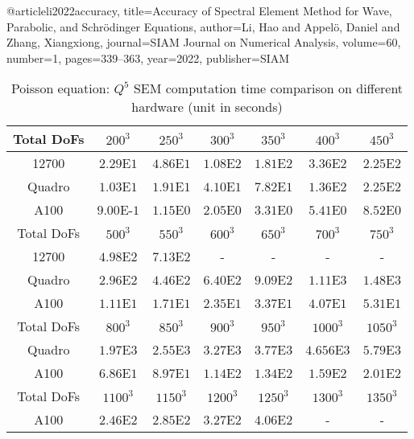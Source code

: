 @article{li2022accuracy,
  title={{Accuracy of Spectral Element Method for Wave, Parabolic, and Schrödinger Equations}},
  author={Li, Hao and Appelö, Daniel and Zhang, Xiangxiong},
  journal={SIAM Journal on Numerical Analysis},
  volume={60},
  number={1},
  pages={339--363},
  year={2022},
  publisher={SIAM}
}
\begin{table}[ht!]
    \centering
    \begin{tabular}{|c|c|c|c|c|c|c|}
    \hline
         Total DoFs & $200^3$ & $250^3$ & $300^3$ & $350^3$ & $400^3$ & $450^3$\\
    \hline
         12700 & $2.29$E$1$ & $4.86$E$1$ & $1.08$E$2$ & $1.81$E$2$ & $3.36$E$2$ &
         $2.25$E$2$\\
    \hline
         Quadro & $1.03$E$1$ & $1.91$E$1$ & $4.10$E$1$ & $7.82$E$1$ & $1.36$E$2$ &
         $2.25$E$2$\\

    \hline
         A100 & $9.00$E-$1$ & $1.15$E$0$ & $2.05$E$0$ & $3.31$E$0$ & $5.41$E$0$ &
         $8.52$E$0$\\
    \hline
    \hline
         Total DoFs & $500^3$ & $550^3$ & $600^3$ & $650^3$ & $700^3$ & $750^3$\\
    \hline
         12700 & $4.98$E$2$ & $7.13$E$2$ & - & - & - & - \\
    \hline
         Quadro & $2.96$E$2$ & $4.46$E$2$ & $6.40$E$2$ & $9.09$E$2$ & $1.11$E$3$ &
         $1.48$E$3$\\
    \hline
         A100 & $1.11$E$1$ & $1.71$E$1$ & $2.35$E$1$ & $3.37$E$1$ & $4.07$E$1$ &
         $5.31$E$1$\\
    \hline
    \hline
         Total DoFs & $800^3$ & $850^3$ & $900^3$ & $950^3$ & $1000^3$ & $1050^3$\\
    \hline
         Quadro & $1.97$E$3$ & $2.55$E$3$ & $3.27$E$3$ & $3.77$E$3$ & $4.656$E$3$ & $5.79$E$3$\\
    \hline
         A100  & $6.86$E$1$ & $8.97$E$1$ & $1.14$E$2$ & $1.34$E$2$ & $1.59$E$2$ &
         $2.01$E$2$\\
    \hline
    \hline
         Total DoFs & $1100^3$ & $1150^3$ & $1200^3$ & $1250^3$ & $1300^3$ & $1350^3$\\
    \hline
         A100 & $2.46$E$2$ & $2.85$E$2$ & $3.27$E$2$ & $4.06$E$2$ & - & -\\
    \hline
    \end{tabular}
    \caption{Poisson equation: $Q^5$ SEM computation time comparison on different hardware (unit in seconds)}
    \label{tab3: poisson_CPU_GPU}
\end{table}
